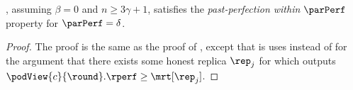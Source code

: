 \begin{lemma}\label{lem:past-perfection-liveness-crash}
	, assuming $\beta = 0$ and $n \geq 3 \gamma + 1$, satisfies the \emph{past-perfection within $\parPerf$} property for $\parPerf = \delta$.
\end{lemma}
\begin{proof}
	The proof is the same as the proof of , except that is uses  instead of  for the argument that there exists some honest replica $\rep_j$ for which \client outputs $\podView{c}{\round}.\rperf \geq \mrt[\rep_j]$.
\end{proof}


